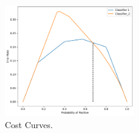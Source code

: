 \documentclass[a4paper]{article}
\begin{document}
{\begin{enumerate}
\begin{figure}[h]
    \centering
    \includegraphics[width=0.5\textwidth]{figures/cost_curves}
    \caption{Cost Curves.}
    \label{fig:cost_curves}
\end{figure}

\end{enumerate}

}
\end{document}
